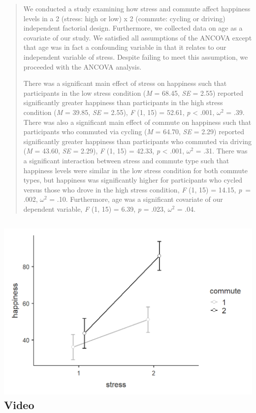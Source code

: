\documentclass[
]{book}
\begin{document}
\begin{quote}
We conducted a study examining how stress and commute affect happiness levels in a 2 (stress: high or low) x 2 (commute: cycling or driving) independent factorial design. Furthermore, we collected data on age as a covariate of our study. We satisfied all assumptions of the ANCOVA except that age was in fact a confounding variable in that it relates to our independent variable of stress. Despite failing to meet this assumption, we proceeded with the ANCOVA analysis.

There was a significant main effect of stress on happiness such that participants in the low stress condition (\emph{M} = 68.45, \emph{SE} = 2.55) reported significantly greater happiness than participants in the high stress condition (\emph{M} = 39.85, \emph{SE} = 2.55), \emph{F} (1, 15) = 52.61, \emph{p} \textless{} .001, \(\omega^2\) = .39. There was also a significant main effect of commute on happiness such that participants who commuted via cycling (\emph{M} = 64.70, \emph{SE} = 2.29) reported significantly greater happiness than participants who commuted via driving (\emph{M} = 43.60, \emph{SE} = 2.29), \emph{F} (1, 15) = 42.33, \emph{p} \textless{} .001, \(\omega^2\) = .31. There was a significant interaction between stress and commute type such that happiness levels were similar in the low stress condition for both commute types, but happiness was significantly higher for participants who cycled versus those who drove in the high stress condition, \emph{F} (1, 15) = 14.15, \emph{p}~= .002, \(\omega^2\) = .10. Furthermore, age was a significant covariate of our dependent variable, \emph{F} (1, 15) = 6.39, \emph{p} = .023, \(\omega^2\) = .04.
\end{quote}

\hypertarget{video-8}{%
\subsection[ Video]{\texorpdfstring{\protect\includegraphics{images/07-ancova/ancova_interaction.png} Video}{ Video}}\label{video-8}}
\end{document}

